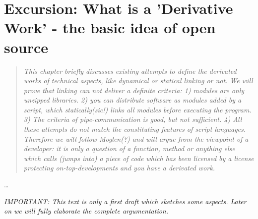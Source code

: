 %
%
%
%
%



\section{Excursion: What is a 'Derivative Work' - the basic idea of open source}
\footnotesize
\begin{quote}\itshape
This chapter briefly discusses existing attempts to define the derivated works of
technical aspects, like dynamical or statical linking or not. We will
prove that linking can not deliver a definite criteria: 1) modules are only
unzipped libraries. 2) you can distribute software as modules added by a script,
which statically(sic!) links all modules before executing the program. 3) The
criteria of pipe-communication is good, but not sufficient. 4) All these
attempts do not match the constituting features of script languages. Therefore we
will follow Moglen(?) and will argue from the viewpoint of a developer: it is
only a question of a function, method or anything else which calls (jumps into)
a piece of code which has been licensed by a license protecting
on-top-developments and you have a derivated work.
\end{quote}
\normalsize
\ldots

\textit{\emph{IMPORTANT}: This text is only a first draft which sketches some
aspects. Later on we will fully elaborate the complete argumentation.}

